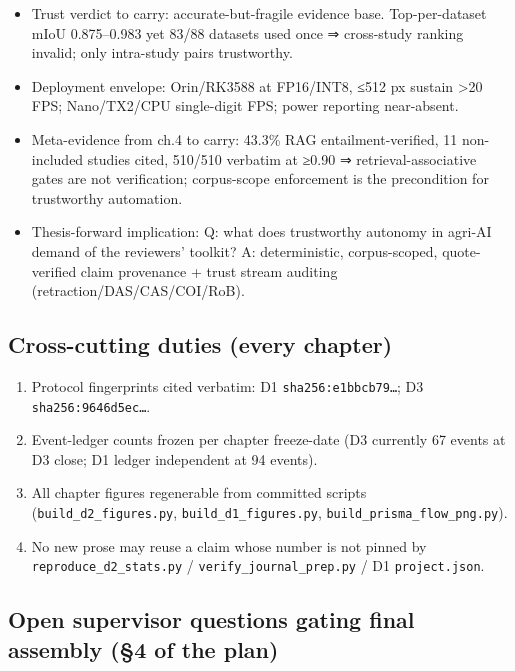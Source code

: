\documentclass[11pt]{article}
\providecommand{\tightlist}{%
  \setlength{\itemsep}{0pt}\setlength{\parskip}{0pt}}
\begin{document}
\begin{itemize}
\tightlist
\item
  Trust verdict to carry: accurate-but-fragile evidence base.
  Top-per-dataset mIoU 0.875--0.983 yet 83/88 datasets used once ⇒
  cross-study ranking invalid; only intra-study pairs trustworthy.
\item
  Deployment envelope: Orin/RK3588 at FP16/INT8, ≤512 px sustain
  \textgreater20 FPS; Nano/TX2/CPU single-digit FPS; power reporting
  near-absent.
\item
  Meta-evidence from ch.4 to carry: 43.3\% RAG entailment-verified, 11
  non-included studies cited, 510/510 verbatim at ≥0.90 ⇒
  retrieval-associative gates are not verification; corpus-scope
  enforcement is the precondition for trustworthy automation.
\item
  Thesis-forward implication: Q: what does trustworthy autonomy in
  agri-AI demand of the reviewers' toolkit? A: deterministic,
  corpus-scoped, quote-verified claim provenance + trust stream auditing
  (retraction/DAS/CAS/COI/RoB).
\end{itemize}

\subsection{Cross-cutting duties (every
chapter)}\label{cross-cutting-duties-every-chapter}

\begin{enumerate}
\def\labelenumi{\arabic{enumi}.}
\tightlist
\item
  Protocol fingerprints cited verbatim: D1 \texttt{sha256:e1bbcb79…}; D3
  \texttt{sha256:9646d5ec…}.
\item
  Event-ledger counts frozen per chapter freeze-date (D3 currently 67
  events at D3 close; D1 ledger independent at 94 events).
\item
  All chapter figures regenerable from committed scripts
  (\texttt{build\_d2\_figures.py}, \texttt{build\_d1\_figures.py},
  \texttt{build\_prisma\_flow\_png.py}).
\item
  No new prose may reuse a claim whose number is not pinned by
  \texttt{reproduce\_d2\_stats.py} / \texttt{verify\_journal\_prep.py} /
  D1 \texttt{project.json}.
\end{enumerate}

\subsection{Open supervisor questions gating final assembly (§4 of the
plan)}\label{open-supervisor-questions-gating-final-assembly-4-of-the-plan}
\end{document}
